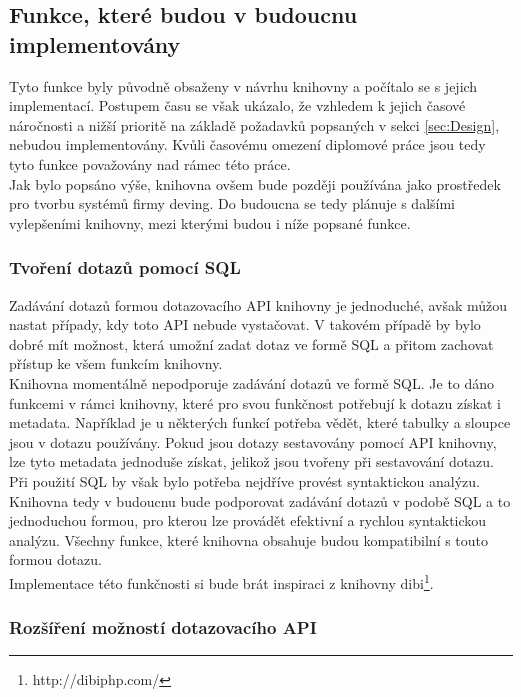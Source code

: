 \documentclass[ing,male,java,dept456]{diploma}						%
\begin{document}
\subsection{Funkce, které budou v budoucnu implementovány}

Tyto funkce byly původně obsaženy v návrhu knihovny a počítalo se s jejich implementací. Postupem času se však ukázalo, že vzhledem k jejich časové náročnosti a nižší prioritě na základě požadavků popsaných v sekci \ref{sec:Design}, nebudou implementovány. Kvůli časovému omezení diplomové práce jsou tedy tyto funkce považovány nad rámec této práce. \\
Jak bylo popsáno výše, knihovna ovšem bude později používána jako prostředek pro tvorbu systémů firmy deving. Do budoucna se tedy plánuje s dalšími vylepšeními knihovny, mezi kterými budou i níže popsané funkce.

\subsubsection{Tvoření dotazů pomocí SQL}

Zadávání dotazů formou dotazovacího API knihovny je jednoduché, avšak můžou nastat případy, kdy toto API nebude vystačovat. V takovém případě by bylo dobré mít možnost, která umožní zadat dotaz ve formě SQL a přitom zachovat přístup ke všem funkcím  knihovny. \\
Knihovna momentálně nepodporuje zadávání dotazů ve formě SQL. Je to dáno funkcemi v rámci knihovny, které pro svou funkčnost potřebují k dotazu získat i metadata. Například je u některých funkcí potřeba vědět, které tabulky a sloupce jsou v dotazu používány. Pokud jsou dotazy sestavovány pomocí API knihovny, lze tyto metadata jednoduše získat, jelikož jsou tvořeny při sestavování dotazu. Při použití SQL by však bylo potřeba nejdříve provést syntaktickou analýzu. \\
Knihovna tedy v budoucnu bude podporovat zadávání dotazů v podobě SQL a to jednoduchou formou, pro kterou lze provádět efektivní a rychlou syntaktickou analýzu. Všechny funkce, které knihovna obsahuje budou kompatibilní s touto formou dotazu. \\
Implementace této funkčnosti si bude brát inspiraci z knihovny dibi\footnote{http://dibiphp.com/}.

\subsubsection{Rozšíření možností dotazovacího API}
\end{document}
